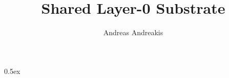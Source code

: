 \documentclass[11pt,a4paper]{article}
\begin{document}
\title{Shared Layer-0 Substrate}
\author{Andreas Andreakis}
\maketitle

\tableofcontents

\parindent 0pt\parskip 0.5ex


\nocite{placeholder}


\end{document}
